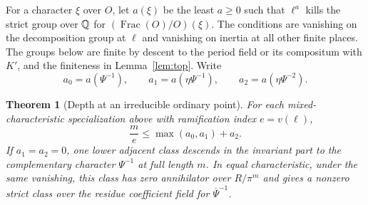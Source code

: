 \documentclass[a4paper,11pt]{article}
\newtheorem{theorem}[proposition]{Theorem}
\theoremstyle{definition}
\theoremstyle{remark}
\numberwithin{equation}{section}
\begin{document}
For a character \(\xi\) over \(O\), let \(a(\xi)\) be the least \(a\ge0\)
such that \(\ell^a\) kills the strict group over \(\mathbb Q\) for
\((\operatorname{Frac}(O)/O)(\xi)\). The conditions are vanishing
on the decomposition group at \(\ell\) and vanishing on inertia at
all other finite places. The groups below are finite by descent to
the period field or its compositum with \(K'\), and the finiteness in
Lemma~\ref{lem:top}. Write
\[
 a_0=a(\Psi^{-1}),\qquad a_1=a(\eta\Psi^{-1}),\qquad
 a_2=a(\eta\Psi^{-2}).
\]

\begin{theorem}[Depth at an irreducible ordinary point]
\label{thm:tracestrict333}
For each mixed-characteristic specialization above with ramification
index \(e=v(\ell)\),
\[
                  \frac{m}{e}\le \max(a_0,a_1)+a_2 .
\]
If \(a_1=a_2=0\), one lower adjacent class descends in the invariant
part to the complementary character \(\Psi^{-1}\) at full length \(m\).
In equal characteristic, under the same vanishing, this class has
zero annihilator over \(R/\pi^m\) and gives a nonzero strict class
over the residue coefficient field for \(\overline\Psi^{-1}\).
\end{theorem}
\end{document}
